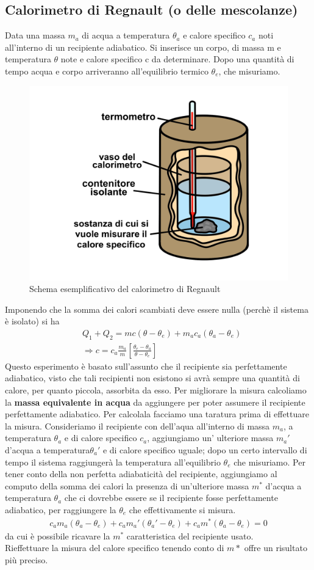 \documentclass[10pt,a4paper]{article}
\begin{document}
\subsection*{Calorimetro di Regnault (o delle mescolanze)}
Data una massa $m_a$ di acqua a temperatura $\theta_a$ e calore specifico $c_a$ noti all'interno di un recipiente adiabatico. Si inserisce un corpo, di massa m e temperatura $\theta$ note e calore specifico c da determinare. Dopo una quantità di tempo acqua e corpo arriveranno all'equilibrio termico $\theta_e$, che misuriamo.
\begin{figure}[h!]
	\centering
	\includegraphics[width=0.5\linewidth]{../images/calorimetro_regnault}
	\caption{Schema esemplificativo del calorimetro di Regnault}
	\label{fig:calorimetroregnault}
\end{figure}
\FloatBarrier
Imponendo che la somma dei calori scambiati deve essere nulla (perchè il sistema è isolato) si ha
\begin{align*} 
&Q_1 + Q_2 = m c \left(\theta - \theta_e\right) + m_a c_a \left(\theta_a - \theta_e \right) \\
&\Rightarrow c = c_a \frac{m_a}{m}\left[\frac{\theta_e - \theta_a}{\theta - \theta_e}\right]
\end{align*} 
Questo esperimento è basato sull'assunto che il recipiente sia perfettamente adiabatico, visto che tali recipienti non esistono si avrà sempre una quantità di calore, per quanto piccola, assorbita da esso. Per migliorare la misura calcoliamo la \textbf{massa equivalente in acqua} da aggiungere per poter assumere il recipiente perfettamente adiabatico. Per calcolala facciamo una taratura prima di effettuare la misura. Consideriamo il recipiente con dell'aqua all'interno di massa \(m_a\), a temperatura \(\theta_a\) e di calore specifico \(c_a\), aggiungiamo un' ulteriore massa \(m_a'\) d'acqua a temperatura\(\theta_a'\) e di calore specifico uguale; dopo un certo intervallo di tempo il sistema raggiungerà la temperatura all'equilibrio \(\theta_e\) che misuriamo. Per tener conto della non perfetta adiabaticità del recipiente, aggiungiamo al computo della somma dei calori la presenza di un'ulteriore massa \(m^*\) d'acqua a temperatura \(\theta_a\) che ci dovrebbe essere se il recipiente fosse perfettamente adiabatico, per raggiungere la $\theta_e$ che effettivamente si misura. 
\begin{align*} 
	c_a m_a (\theta_a-\theta_e)+c_a m_a'(\theta_a'-\theta_e)+c_a m^*(\theta_a-\theta_e) = 0
\end{align*} 
da cui è possibile ricavare la \(m^*\) caratteristica del recipiente usato.\\
Rieffettuare la misura del calore specifico tenendo conto di \(m*\) offre un risultato più preciso. 
\end{document}
